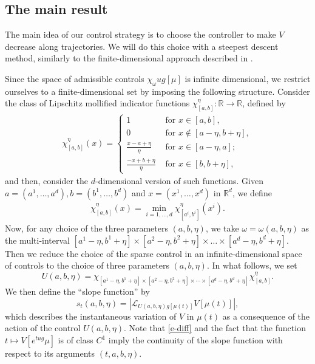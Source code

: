 \documentclass{article}
\newcommand{\R}{\mathbb{R}}
\renewcommand{\L}{\mathcal{L}}
\theoremstyle{definition}\newtheorem{remark}{Remark}
\newcommand{\bqn}{\begin{eqnarray}}
\newcommand{\eqnn}{\nonumber\end{eqnarray}}
\newcommand{\eqnl}[1]{\label{#1}\end{eqnarray}}
\renewcommand{\r}[1]{\eqref{#1}}
\begin{document}
\subsection{The main result}
The main idea of our control strategy is to choose the controller to make $V$ decrease along trajectories. We will do this choice with a steepest descent method, similarly to the finite-dimensional approach described in \cite{CS-control,CS-control-1,finiteJQ}.

Since the space of admissible controls $\chi_{\omega} u g[\mu]$ is infinite dimensional, we restrict ourselves to a finite-dimensional set by imposing the following structure.
Consider the class of Lipschitz mollified indicator functions $\chi_{[a,b]}^\eta:\R\to\R$, defined by
\bqn
\chi^\eta_{[a,b]}(x)=
\begin{cases}
1&\mbox{ for }x\in[a,b],\\
0&\mbox{~for } x\not\in[a-\eta,b+\eta],\\
\frac{x-a+\eta}{\eta}& \mbox{~for } x\in[a-\eta,a];\\
\frac{-x+b+\eta}{\eta}& \mbox{~for } x\in[b,b+\eta],
\end{cases}
\eqnn
and then, consider the $d$-dimensional version of such functions. Given $a = (a^1,\ldots,a^d), b= (b^1,\ldots,b^d)$ and $x = (x^1,\ldots,x^d) $ in $\R^d$, we define
\bqn
\chi^\eta_{[a,b]}(x)= \min_{i=1,\ldots,d}  \chi^\eta_{[a^i,b^i]}(x^i) .
\eqnl{e-chi}
Now, for any choice of the three parameters $(a,b,\eta)$, we take $\omega=\omega(a,b,\eta)$ as  the multi-interval $[a^1-\eta,b^1+\eta]\times [a^2-\eta,b^2+\eta]\times\ldots\times [a^d-\eta,b^d+\eta]$. 
Then we reduce the choice of the sparse control in an infinite-dimensional space of controls %
 to the choice of three parameters $(a,b,\eta)$. 
In what follows, we set 
\begin{equation}\label{e-U}
 U(a,b,\eta) %
 =\chi_{[a^1-\eta,b^1+\eta]\times [a^2-\eta,b^2+\eta]\times\cdots\times [a^d-\eta,b^d+\eta]}  \chi^\eta_{[a,b]}.
\end{equation}
We then define the ``slope function'' by
$$
s_{t}(a,b,\eta)=|\L_{U(a,b,\eta)g[\mu(t)]} V[\mu(t)]|,
$$
which describes the instantaneous variation of $V$ in $\mu(t)$ as a consequence of the action of the control $U(a,b,\eta)$. Note that \r{e-diff} and the fact that the function $t\mapsto V[e^{tug}\mu]$ is of class $C^1$ imply the continuity of the slope function with respect to its arguments $(t,a,b,\eta)$.
\end{document}
